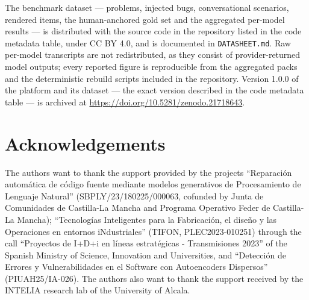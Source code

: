 \documentclass[preprint,12pt, a4paper]{elsarticle}
\begin{document}
The benchmark dataset --- problems, injected bugs, conversational scenarios,
rendered items, the human-anchored gold set and the aggregated per-model
results --- is distributed with the source code in the repository listed in
the code metadata table, under CC BY 4.0, and is documented in
\texttt{DATASHEET.md}. Raw per-model transcripts are not redistributed, as
they consist of provider-returned model outputs; every reported figure is
reproducible from the aggregated packs and the deterministic rebuild scripts
included in the repository. Version 1.0.0 of the platform and its dataset ---
the exact version described in the code metadata table --- is archived at
\url{https://doi.org/10.5281/zenodo.21718643}.

\section*{Acknowledgements}

The authors want to thank the support provided by the projects ``Reparación
automática de código fuente mediante modelos generativos de Procesamiento de
Lenguaje Natural'' (SBPLY/23/180225/000063, cofunded by Junta de Comunidades
de Castilla-La Mancha and Programa Operativo Feder de Castilla-La Mancha);
``Tecnologías Inteligentes para la Fabricación, el diseño y las Operaciones en
entornos iNdustriales'' (TIFON, PLEC2023-010251) through the call ``Proyectos
de I+D+i en líneas estratégicas - Transmisiones 2023'' of the Spanish Ministry
of Science, Innovation and Universities, and ``Detección de Errores y
Vulnerabilidades en el Software con Autoencoders Dispersos'' (PIUAH25/IA-026).
The authors also want to thank the support received by the INTELIA research
lab of the University of Alcala.
\end{document}
